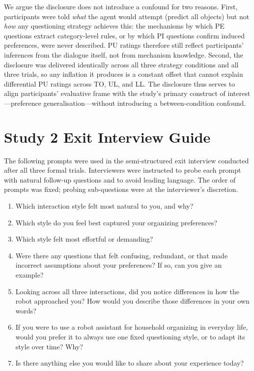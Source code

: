 \documentclass[manuscript,review,anonymous]{acmart}
\begin{document}
We argue the disclosure does not introduce a confound for two reasons. First, participants were told \textit{what} the agent would attempt (predict all objects) but not \textit{how} any questioning strategy achieves this: the mechanisms by which PE questions extract category-level rules, or by which PI questions confirm induced preferences, were never described. PU ratings therefore still reflect participants' inferences from the dialogue itself, not from mechanism knowledge. Second, the disclosure was delivered identically across all three strategy conditions and all three trials, so any inflation it produces is a constant offset that cannot explain differential PU ratings across TO, UL, and LL. The disclosure thus serves to align participants' evaluative frame with the study's primary construct of interest---preference generalisation---without introducing a between-condition confound.

\section{Study 2 Exit Interview Guide}
\label{app:interview-guide}

The following prompts were used in the semi-structured exit interview conducted after all three formal trials. Interviewers were instructed to probe each prompt with natural follow-up questions and to avoid leading language. The order of prompts was fixed; probing sub-questions were at the interviewer's discretion.

\begin{enumerate}[leftmargin=*, label=\textbf{Q\arabic*.}]
  \item Which interaction style felt most natural to you, and why?
  \item Which style do you feel best captured your organizing preferences?
  \item Which style felt most effortful or demanding?
  \item Were there any questions that felt confusing, redundant, or that made incorrect assumptions about your preferences? If so, can you give an example?
  \item Looking across all three interactions, did you notice differences in how the robot approached you? How would you describe those differences in your own words?
  \item If you were to use a robot assistant for household organizing in everyday life, would you prefer it to always use one fixed questioning style, or to adapt its style over time? Why?
  \item Is there anything else you would like to share about your experience today?
\end{enumerate}

\end{document}
